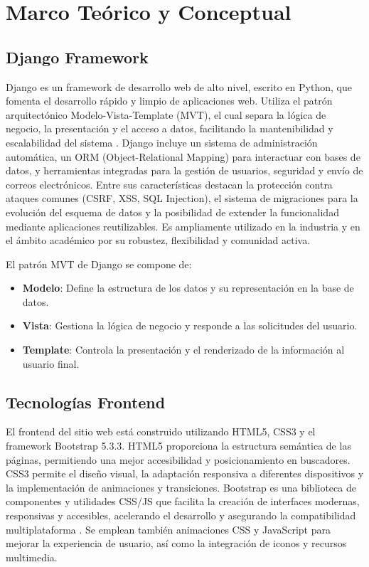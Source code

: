\chapter{Marco Teórico y Conceptual}

\section{Django Framework}
Django es un framework de desarrollo web de alto nivel, escrito en Python, que fomenta el desarrollo rápido y limpio de aplicaciones web. Utiliza el patrón arquitectónico Modelo-Vista-Template (MVT), el cual separa la lógica de negocio, la presentación y el acceso a datos, facilitando la mantenibilidad y escalabilidad del sistema \cite{django-docs}. Django incluye un sistema de administración automática, un ORM (Object-Relational Mapping) para interactuar con bases de datos, y herramientas integradas para la gestión de usuarios, seguridad y envío de correos electrónicos. Entre sus características destacan la protección contra ataques comunes (CSRF, XSS, SQL Injection), el sistema de migraciones para la evolución del esquema de datos y la posibilidad de extender la funcionalidad mediante aplicaciones reutilizables. Es ampliamente utilizado en la industria y en el ámbito académico por su robustez, flexibilidad y comunidad activa.

El patrón MVT de Django se compone de:
\begin{itemize}
    \item \textbf{Modelo}: Define la estructura de los datos y su representación en la base de datos.
    \item \textbf{Vista}: Gestiona la lógica de negocio y responde a las solicitudes del usuario.
    \item \textbf{Template}: Controla la presentación y el renderizado de la información al usuario final.
\end{itemize}

\section{Tecnologías Frontend}
El frontend del sitio web está construido utilizando HTML5, CSS3 y el framework Bootstrap 5.3.3. HTML5 proporciona la estructura semántica de las páginas, permitiendo una mejor accesibilidad y posicionamiento en buscadores. CSS3 permite el diseño visual, la adaptación responsiva a diferentes dispositivos y la implementación de animaciones y transiciones. Bootstrap es una biblioteca de componentes y utilidades CSS/JS que facilita la creación de interfaces modernas, responsivas y accesibles, acelerando el desarrollo y asegurando la compatibilidad multiplataforma \cite{bootstrap-docs}. Se emplean también animaciones CSS y JavaScript para mejorar la experiencia de usuario, así como la integración de iconos y recursos multimedia.

